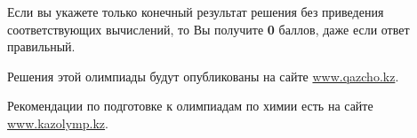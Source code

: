 \begin{regulations}
Если вы укажете только конечный результат решения без приведения соответствующих вычислений, то Вы получите \textbf{0} баллов, даже если ответ правильный.

Решения этой олимпиады будут опубликованы на сайте \href{https://qazcho.kz}{www.qazcho.kz}.

Рекомендации по подготовке к олимпиадам по химии есть на сайте \\ \href{https://kazolymp.kz}{www.kazolymp.kz}.
\end{regulations}